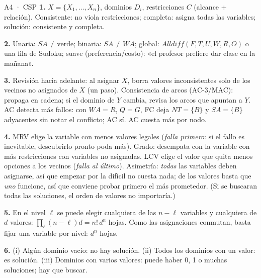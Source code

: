 \begin{solucion}{A4 · CSP}
\textbf{1.} $X=\{X_1,\dots,X_n\}$, dominios $D_i$, restricciones $C$ (alcance + relación).
Consistente: no viola restricciones; completa: asigna todas las variables; solución: consistente y
completa.

\textbf{2.} Unaria: $SA\ne\text{verde}$; binaria: $SA\ne WA$; global: $\textit{Alldiff}(F,T,U,W,R,O)$
o una fila de Sudoku; suave (preferencia/costo): «el profesor prefiere dar clase en la mañana».

\textbf{3.} Revisión hacia adelante: al asignar $X$, borra valores inconsistentes solo de los vecinos
no asignados de $X$ (un paso). Consistencia de arcos (AC-3/MAC): propaga en cadena; si el dominio
de $Y$ cambia, revisa los arcos que apuntan a $Y$. AC detecta más fallos: con $WA=R$, $Q=G$, FC deja
$NT=\{B\}$ y $SA=\{B\}$ adyacentes sin notar el conflicto; AC sí. AC cuesta más por nodo.

\textbf{4.} MRV elige la variable con menos valores legales (\emph{falla primero}: si el fallo es
inevitable, descubrirlo pronto poda más). Grado: desempata con la variable con más restricciones con
variables no asignadas. LCV elige el valor que quita menos opciones a los vecinos (\emph{falla al
último}). Asimetría: \emph{todas} las variables deben asignarse, así que empezar por la difícil no
cuesta nada; de los valores basta que \emph{uno} funcione, así que conviene probar primero el más
prometedor. (Si se buscaran todas las soluciones, el orden de valores no importaría.)

\textbf{5.} En el nivel $\ell$ se puede elegir cualquiera de las $n-\ell$ variables y cualquiera de
$d$ valores: $\prod_\ell (n-\ell)d=n!\,d^n$ hojas. Como las asignaciones conmutan, basta fijar una
variable por nivel: $d^n$ hojas.

\textbf{6.} (i) Algún dominio vacío: no hay solución. (ii) Todos los dominios con un valor: es
solución. (iii) Dominios con varios valores: puede haber 0, 1 o muchas soluciones; hay que buscar.
\end{solucion}

